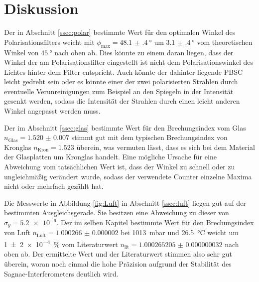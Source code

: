 
\section{Diskussion}
\label{sec:Diskussion}
Der in Abschnitt \ref{ssec:polar} bestimmte Wert für den optimalen Winkel des Polarisationsfilters weicht mit $\phi_\text{max}=\SI{48.1(4)}{\degree}$ um $\SI{3.1(4)}{\degree}$ vom theoretischen Winkel von $\SI{45}{\degree}$ nach oben ab. Dies könnte zu einem daran liegen, dass der Winkel der am Polarisationsfilter eingestellt ist nicht dem Polarisationswinkel des Lichtes hinter dem Filter entspricht. Auch könnte der dahinter liegende PBSC leicht gedreht sein oder es könnte einer der zwei polarisierten Strahlen durch eventuelle Verunreinigungen zum Beispiel an den Spiegeln in der Intensität gesenkt werden, sodass die Intensität der Strahlen durch einen leicht anderen Winkel angepasst werden muss. 



Der im Abschnitt \ref{ssec:glas} bestimmte Wert für den Brechungsindex vom Glas $n_\text{Glas}=\num{1.520(7)}$ stimmt gut mit dem typischen Brechungsindex von Kronglas $n_\text{Kron}=\num{1.523}$ \cite{nKron} überein, was vermuten lässt, dass es sich bei dem Material der Glasplatten um Kronglas handelt. Eine mögliche Ursache für eine Abweichung vom tatsächlichen Wert ist, dass der Winkel zu schnell oder zu ungleichmäßig verändert wurde, sodass der verwendete Counter einzelne Maxima nicht oder mehrfach gezählt hat.

Die Messwerte in Abbildung \ref{fig:Luft} in Abschnitt \ref{ssec:luft} liegen gut auf der bestimmten Ausgleichsgerade. Sie besitzen eine Abweichung zu dieser von $\sigma_y=\num{5.2e-6}$. Der im selben Kapitel bestimmte Wert für den Brechungsindex von Luft $n_\text{Luft}=\num{1.000266(2)}$ bei \SI{1013}{\milli\bar} und \SI{26.5}{\degreeCelsius} weicht um \SI{1(2)e-4}{\percent} vom Literaturwert $n_\text{lit}=\num{1.000265205(32)}$ \cite{nist} nach oben ab. Der ermittelte Wert und der Literaturwert stimmen also sehr gut überein, woran noch einmal die hohe Präzision aufgrund der Stabilität des Sagnac-Interferometers deutlich wird.


